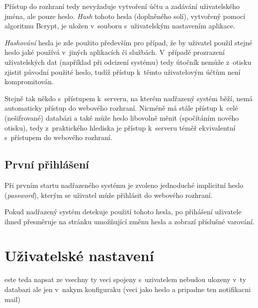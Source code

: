 Přístup do rozhraní tedy nevyžaduje vytvoření účtu a zadávání uživatelského jména, ale pouze heslo. \textit{Hash} tohoto hesla (doplněného solí), vytvořený pomocí algoritmu Bcrypt, je uložen v~souboru s~uživatelským nastavením aplikace.

\textit{Hashování} hesla je zde použito především pro případ, že by uživatel použil stejné heslo jaké používá v~jiných aplikacích či službách. V~případě prozrazení uživatelských dat (například při odcizení systému) tedy útočník nemůže z~otisku zjistit původní použité heslo, tudíž přístup k~těmto uživatelovým účtům není kompromitován.

Stejně tak někdo s~přístupem k~serveru, na kterém nadřazený systém běží, nemá automaticky přístup do webového rozhraní. Nicméně má stále přístup k~celé (nešifrované) databázi a také může heslo libovolně měnit (spočítáním nového otisku), tedy z~praktického hlediska je přístup k~serveru téměř ekvivalentní s~přístupem do webového rozhraní.

\subsection{První přihlášení}

Při prvním startu nadřazeného systému je zvoleno jednoduché implicitní heslo (\textit{password}), kterým se uživatel může přihlásit do webového rozhraní. 

Pokud nadřazený systém detekuje použití tohoto hesla, po přihášení uživatele ihned přesměruje na stránku umožňující změnu hesla a zobrazí příslušné varování.

\section{Uživatelské nastavení}

este teda napsat ze vsechny ty veci spojeny s~uzivatelem nebudou ulozeny v~ty databazi ale jen v~nakym konfiguraku (veci jako heslo a pripadne ten notifikacni mail)
